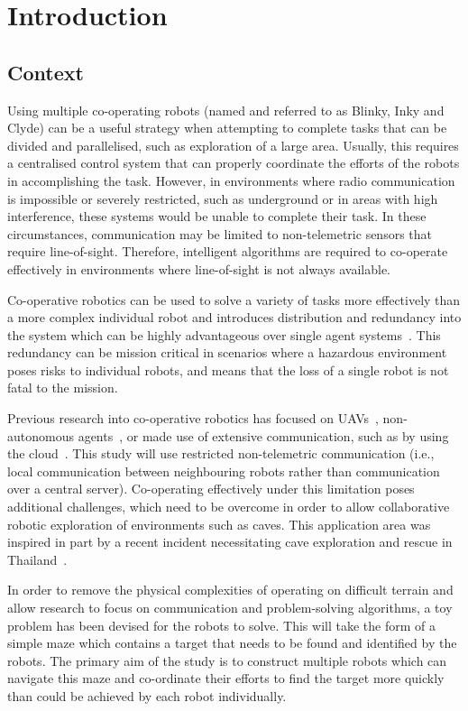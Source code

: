 
\chapter{Introduction}\label{introduction}
\section{Context}\label{introduction/context}
Using multiple co-operating robots (named and referred to as Blinky, Inky
and Clyde) can be a useful strategy when attempting to complete tasks that
can be divided and parallelised, such as exploration of a large area.
Usually, this requires a centralised control system that can properly
coordinate the efforts of the robots in accomplishing the task. However, in
environments where radio communication is impossible or severely restricted,
such as underground or in areas with high interference, these systems would
be unable to complete their task. In these circumstances, communication may
be limited to non-telemetric sensors that require line-of-sight. Therefore,
intelligent algorithms are required to co-operate effectively in
environments where line-of-sight is not always available. 

Co-operative robotics can be used to solve a variety of tasks more 
effectively than a more complex individual robot and introduces distribution
and redundancy into the system which can be highly advantageous over single 
agent systems~\cite{dudek96}. This redundancy can be mission critical in 
scenarios where a hazardous environment poses risks to individual robots, and 
means that the loss of a single robot is not fatal to the mission.

Previous research into co-operative robotics has focused on UAVs~\cite{khan18},
non-autonomous agents~\cite{jimenez18}, or made use of extensive
communication, such as by using the cloud~\cite{wensing2018cooperative}.
This study will use restricted non-telemetric communication (i.e., local 
communication between neighbouring robots rather than communication over a 
central server). Co-operating effectively under this limitation poses
additional challenges, which need to be overcome in order to allow
collaborative robotic exploration of environments such as caves. This
application area was inspired in part by a recent incident necessitating cave 
exploration and rescue in Thailand~\cite{bbcthailand}.

In order to remove the physical complexities of operating on difficult
terrain and allow research to focus on communication and problem-solving 
algorithms, a toy problem has been devised for the robots to solve. This
will take the form of a simple maze which contains a target that needs to
be found and identified by the robots. The primary aim of the study is to
construct multiple robots which can navigate this maze and co-ordinate their
efforts to find the target more quickly than could be achieved by each robot 
individually.

